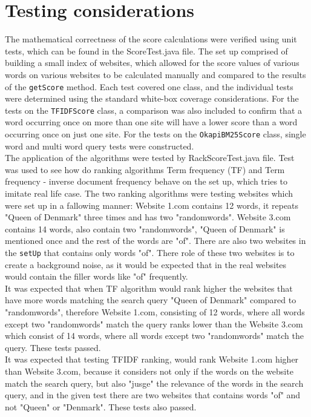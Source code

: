 \section{Testing considerations}
The mathematical correctness of the score calculations were verified using unit tests, which can be found in the ScoreTest.java file.
The set up comprised of building a small index of websites, which allowed for the score values of various words on various
websites to be calculated manually and compared to the results of the {\tt getScore} method.
Each test covered one class, and the individual tests were determined using the standard white-box coverage considerations.
For the tests on the {\tt TFIDFScore} class, a comparison was also included to confirm that a word occurring once on more than one site will have a lower score than a word occurring once on just one site.
For the tests on the {\tt OkapiBM25Score} class, single word and multi word query tests were constructed.\\
The application of the algorithms were tested by RackScoreTest.java file. Test was used to see how do ranking algorithms Term frequency (TF) and Term frequency - inverse document frequency  behave on the set up, which tries to imitate real life case. The two ranking algorithms were testing websites which were set up in a fallowing manner: Website 1.com contains 12 words, it repeats "Queen of Denmark" three times and has two "randomwords". Website 3.com contains 14 words, also contain two "randomwords", "Queen of Denmark" is mentioned once and the rest of the words are "of". There are also two websites in the {\tt setUp} that contains only words "of". There role of these two websites is to create a background noise, as it would be expected that in the real websites would contain the filler words like "of" frequently. \\
It was expected that when TF algorithm would rank higher the websites that have more words matching the search query "Queen of Denmark" compared to "randomwords", therefore Website 1.com, consisting of 12 words, where all words except two "randomwords" match the query ranks lower than the Website 3.com which consist of 14 words, where all words except two "randomwords" match the query. These tests passed.\\
It was expected that testing TFIDF ranking, would rank Website 1.com higher than Website 3.com, because it considers not only if the words on the website match the search query, but also "jusge" the relevance of the words in the search query, and in the given test there are two websites that contains words "of" and not "Queen" or "Denmark". These tests also passed. 

